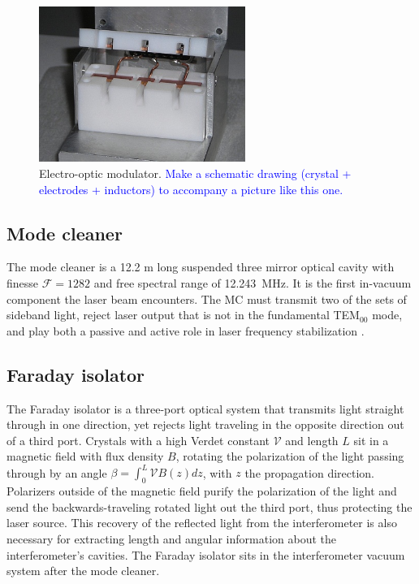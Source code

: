 \begin{figure}
\begin{centering}
\includegraphics[width=0.6\textwidth]{figures/EOMinsidephoto.jpg}
\caption{Electro-optic modulator. \textcolor{blue}{Make a schematic
    drawing (crystal + electrodes + inductors) to accompany a picture
    like this one.}}
\label{fig:EOM}
\end{centering}
\end{figure}

\subsection{Mode cleaner}
The mode cleaner is a 12.2 m long suspended three mirror optical cavity
with finesse $\mathcal{F}=1282$ and free spectral range of
12.243~MHz. It is the first in-vacuum component the laser beam
encounters. The MC must transmit two of the sets of sideband light,
reject laser output that is not in the fundamental TEM$_{00}$ mode, and
play both a passive and active role in laser frequency stabilization
\cite{Zucker2002H1}.

\subsection{Faraday isolator}
The Faraday isolator is a three-port optical system that transmits
light straight through in one direction, yet rejects light traveling
in the opposite direction out of a third port. Crystals with a high
Verdet constant $\mathcal{V}$ and length $L$ sit in a magnetic field
with flux density $B$, rotating the polarization of the light passing
through by an angle $\beta = \int_0^L \mathcal{V} B(z) dz$, with $z$
the propagation direction. Polarizers outside of the magnetic field
purify the polarization of the light and send the backwards-traveling
rotated light out the third port, thus protecting the laser
source. This recovery of the reflected light from the interferometer
is also necessary for extracting length and angular information about
the interferometer's cavities. The Faraday isolator sits in the
interferometer vacuum system after the mode cleaner.


